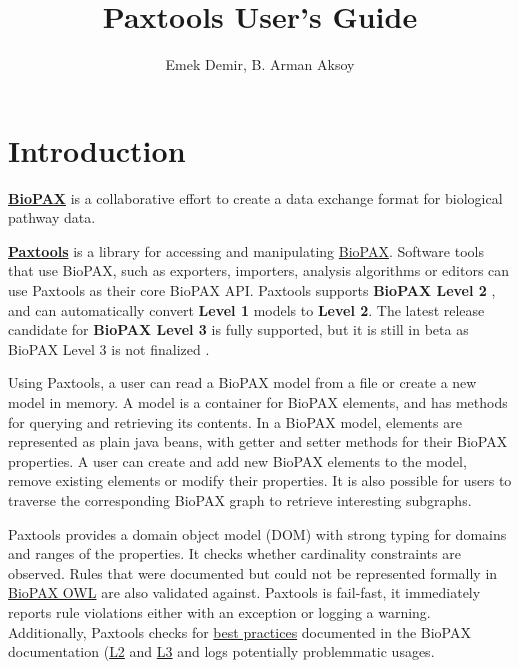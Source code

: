 \documentclass[10pt]{article}
\title{Paxtools User's Guide}
\author{Emek Demir, B. Arman Aksoy}
\begin{document}
\maketitle

\section{Introduction}
\href{http://www.biopax.org}{\textbf{BioPAX}} is a collaborative effort to create a data exchange format for biological pathway data.

\href{http://www.biopax.org/paxtools}{\textbf{Paxtools}} is a library for accessing and manipulating \href{http://www.biopax.org}{BioPAX}. Software tools that use BioPAX, such as exporters, importers, analysis algorithms or editors can use Paxtools as their core BioPAX API. Paxtools supports \textbf{BioPAX Level 2} \cite{biopax2}, and can automatically convert \textbf{Level 1} \cite{biopax1} models to \textbf{Level 2}. The latest release candidate for \textbf{BioPAX Level 3} is fully supported, but it is still in beta as BioPAX Level 3 is not finalized \cite{biopax3}.

Using Paxtools, a user can read a BioPAX model from a file or create a new model in memory. A model is a container for BioPAX elements, and has methods for querying and retrieving its contents. In a BioPAX model, elements are represented as plain java beans, with getter and setter methods for their BioPAX properties. A user can create and add new BioPAX elements to the model, remove existing elements or modify their properties. It is also possible for users to traverse the corresponding BioPAX graph to retrieve interesting subgraphs.

Paxtools provides a domain object model (DOM) with strong typing for domains and ranges of the properties. It checks whether cardinality constraints are observed. Rules that were documented but could not be represented formally in \href{http://www.biopax.org/release/biopax-level2.owl}{BioPAX OWL} are also validated against. Paxtools is fail-fast, it immediately reports rule violations either with an exception or logging a warning. Additionally, Paxtools checks for \href{http://www.biopaxwiki.org/cgi-bin/moin.cgi/best\_practices}{best practices} documented in the BioPAX documentation (\href{http://www.biopax.org/release/biopax-level2-documentation.pdf}{L2} and \href{http://www.biopax.org/release/biopax-level3-documentation.pdf}{L3} and logs potentially problemmatic usages.
\end{document}

